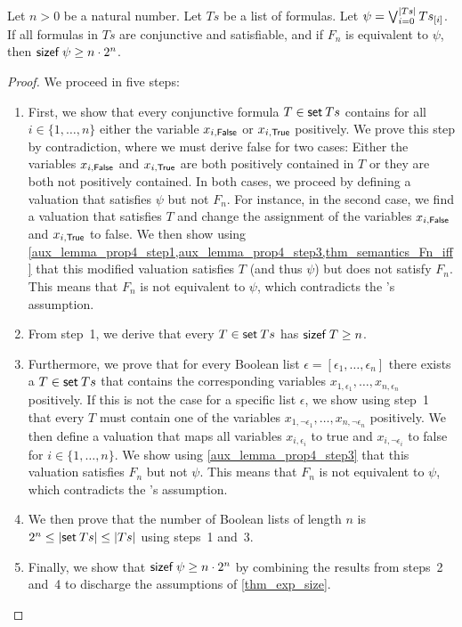 \documentclass[a4paper,USenglish,cleveref, autoref, thm-restate]{lipics-v2021}
\theoremstyle{definition}
\begin{document}
\begin{proposition}
  \label{thm_cnf_to_dnf_blowup}
  Let $n > 0$ be a natural number.
  Let $Ts$ be a list of formulas.
  Let $\psi = \bigvee_{i = 0}^{\left|Ts\right|} {Ts}_{[i]}$.
  If all formulas in $Ts$ are conjunctive and satisfiable, and
  if $F_n$ is equivalent to $\psi$,
  then $\mathsf{sizef} \> \psi \ge n \cdot 2^n$.
\end{proposition}
\begin{proof}
  We proceed in five steps:
  \begin{enumerate}
    \item First, we show that every conjunctive formula $T \in \mathsf{set} \> Ts$ contains for all $i \in \{1,\ldots,n\}$ either the variable $x_{i,\mathsf{False}}$ or $x_{i,\mathsf{True}}$ positively.
    We prove this step by contradiction, where we must derive false for two cases:
    Either the variables $x_{i,\mathsf{False}}$ and $x_{i,\mathsf{True}}$ are both positively contained in $T$ or they are both not positively contained.
    In both cases, we proceed by defining a valuation that satisfies $\psi$ but not $F_n$.
    For instance, in the second case, we find a valuation that satisfies $T$ and change the assignment of the variables $x_{i,\mathsf{False}}$ and $x_{i,\mathsf{True}}$ to false.
    We then show using \cref{aux_lemma_prop4_step1,aux_lemma_prop4_step3,thm_semantics_Fn_iff} that this modified valuation satisfies $T$ (and thus $\psi$) but does not satisfy $F_n$.
    This means that $F_n$ is not equivalent to $\psi$, which contradicts the 's assumption.

    \item From step~1, we derive that every $T \in \mathsf{set} \> Ts$ has $\mathsf{sizef} \> T \ge n$.

    \item Furthermore, we prove that for every Boolean list $\epsilon = [\epsilon_1,\ldots,\epsilon_n]$ there exists a $T \in \mathsf{set} \> Ts$ that contains the corresponding variables $x_{1,\epsilon_1},\ldots,x_{n,\epsilon_n}$ positively.
    If this is not the case for a specific list $\epsilon$, we show using step~1 that every $T$ must contain one of the variables $x_{1,\neg\epsilon_1},\ldots,x_{n,\neg\epsilon_n}$ positively.
    We then define a valuation that maps all variables $x_{i,\epsilon_i}$ to true and $x_{i,\neg\epsilon_i}$ to false for $i \in \{1,\ldots,n\}$.
    We show using \cref{aux_lemma_prop4_step3} that this valuation satisfies $F_n$ but not $\psi$.
    This means that $F_n$ is not equivalent to $\psi$, which contradicts the 's assumption.

    \item We then prove that the number of Boolean lists of length $n$ is $2^n \le \left|\mathsf{set} \> Ts\right| \le \left|Ts\right|$ using steps~1 and~3.

    \item Finally, we show that $\mathsf{sizef} \> \psi \ge n \cdot 2^n$ by combining the results from steps~2 and~4 to discharge the assumptions of \cref{thm_exp_size}. \qedhere
  \end{enumerate}
\end{proof}
\end{document}
